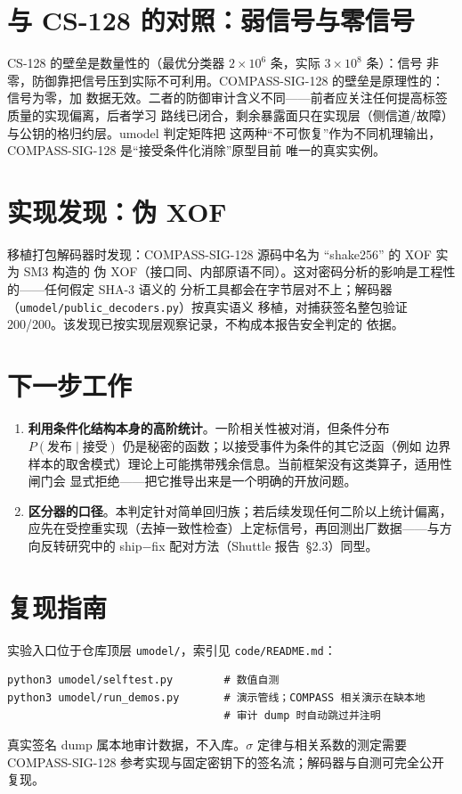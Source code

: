\documentclass[UTF8,11pt,a4paper]{ctexart}
\newcommand{\code}[1]{\texttt{\small #1}}
\begin{document}
\section{与 CS-128 的对照：弱信号与零信号}

CS-128 的壁垒是数量性的（最优分类器 $2\times10^6$ 条，实际 $3\times10^8$ 条）：信号
非零，防御靠把信号压到实际不可利用。COMPASS-SIG-128 的壁垒是原理性的：信号为零，加
数据无效。二者的防御审计含义不同——前者应关注任何提高标签质量的实现偏离，后者学习
路线已闭合，剩余暴露面只在实现层（侧信道/故障）与公钥的格归约层。umodel 判定矩阵把
这两种``不可恢复''作为不同机理输出，COMPASS-SIG-128 是``接受条件化消除''原型目前
唯一的真实实例。

\section{实现发现：伪 XOF}

移植打包解码器时发现：COMPASS-SIG-128 源码中名为 ``shake256'' 的 XOF 实为 SM3 构造的
伪 XOF（接口同、内部原语不同）。这对密码分析的影响是工程性的——任何假定 SHA-3 语义的
分析工具都会在字节层对不上；解码器（\code{umodel/public\_decoders.py}）按真实语义
移植，对捕获签名整包验证 200/200。该发现已按实现层观察记录，不构成本报告安全判定的
依据。

\section{下一步工作}

\begin{enumerate}
\item \textbf{利用条件化结构本身的高阶统计}。一阶相关性被对消，但条件分布
  $P(\text{发布} \mid \text{接受})$ 仍是秘密的函数；以接受事件为条件的其它泛函（例如
  边界样本的取舍模式）理论上可能携带残余信息。当前框架没有这类算子，适用性闸门会
  显式拒绝——把它推导出来是一个明确的开放问题。
\item \textbf{区分器的口径}。本判定针对简单回归族；若后续发现任何二阶以上统计偏离，
  应先在受控重实现（去掉一致性检查）上定标信号，再回测出厂数据——与方向反转研究中的
  ship$-$fix 配对方法（Shuttle 报告~\S2.3）同型。
\end{enumerate}

\section{复现指南}

实验入口位于仓库顶层 \code{umodel/}，索引见 \code{code/README.md}：
\begin{verbatim}
python3 umodel/selftest.py        # 数值自测
python3 umodel/run_demos.py       # 演示管线；COMPASS 相关演示在缺本地
                                  # 审计 dump 时自动跳过并注明
\end{verbatim}
真实签名 dump 属本地审计数据，不入库。$\sigma$ 定律与相关系数的测定需要 COMPASS-SIG-128
参考实现与固定密钥下的签名流；解码器与自测可完全公开复现。
\end{document}
